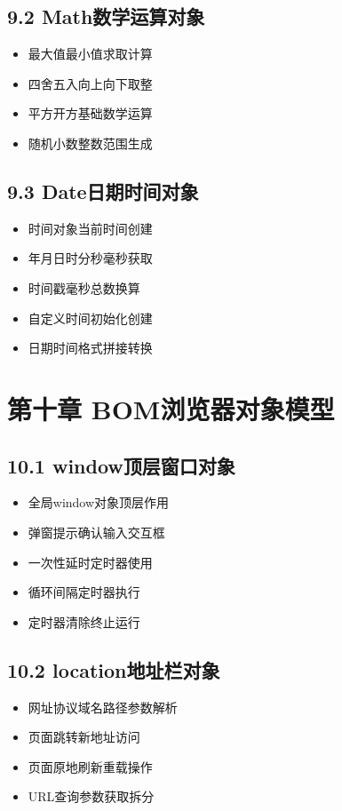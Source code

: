 \subsection{9.2 Math数学运算对象}
\begin{itemize}
\item 最大值最小值求取计算
\item 四舍五入向上向下取整
\item 平方开方基础数学运算
\item 随机小数整数范围生成
\end{itemize}

\subsection{9.3 Date日期时间对象}
\begin{itemize}
\item 时间对象当前时间创建
\item 年月日时分秒毫秒获取
\item 时间戳毫秒总数换算
\item 自定义时间初始化创建
\item 日期时间格式拼接转换
\end{itemize}

\section{第十章 BOM浏览器对象模型}
\subsection{10.1 window顶层窗口对象}
\begin{itemize}
\item 全局window对象顶层作用
\item 弹窗提示确认输入交互框
\item 一次性延时定时器使用
\item 循环间隔定时器执行
\item 定时器清除终止运行
\end{itemize}

\subsection{10.2 location地址栏对象}
\begin{itemize}
\item 网址协议域名路径参数解析
\item 页面跳转新地址访问
\item 页面原地刷新重载操作
\item URL查询参数获取拆分
\end{itemize}

